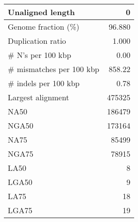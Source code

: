\documentclass[12pt,a4paper]{article}
\begin{document}
\begin{table}[ht]
\begin{center}
\begin{tabular}{|l*{1}{|r}|}
Unaligned length & 0 \\ \hline
Genome fraction (\%) & 96.880 \\ \hline
Duplication ratio & 1.000 \\ \hline
\# N's per 100 kbp & 0.00 \\ \hline
\# mismatches per 100 kbp & 858.22 \\ \hline
\# indels per 100 kbp & 0.78 \\ \hline
Largest alignment & 475325 \\ \hline
NA50 & 186479 \\ \hline
NGA50 & 173164 \\ \hline
NA75 & 85499 \\ \hline
NGA75 & 78915 \\ \hline
LA50 & 8 \\ \hline
LGA50 & 9 \\ \hline
LA75 & 18 \\ \hline
LGA75 & 19 \\ \hline
\end{tabular}
\end{center}
\end{table}
\end{document}
